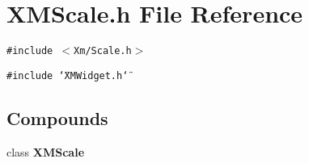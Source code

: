 \section{XMScale.h File Reference}
\label{XMScale_8h}
{\tt \#include $<$Xm/Scale.h$>$}\par
{\tt \#include \char`\"{}XMWidget.h\char`\"{}}\par
\subsection*{Compounds}
\begin{CompactItemize}
\item 
class {\bf XMScale}
\end{CompactItemize}
